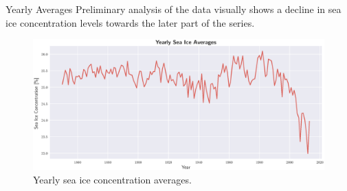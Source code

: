 \documentclass[10pt]{beamer}
\begin{document}
%

\begin{frame}{Yearly Averages}
Preliminary analysis of the data visually shows a decline in sea ice concentration levels towards the later part of the series.

	\begin{figure}[htbp]
		\centering
		\includegraphics[scale=0.37]{yrly_avgs}
		\caption{Yearly sea ice concentration averages.}
	\end{figure}
\end{frame}
\end{document}
